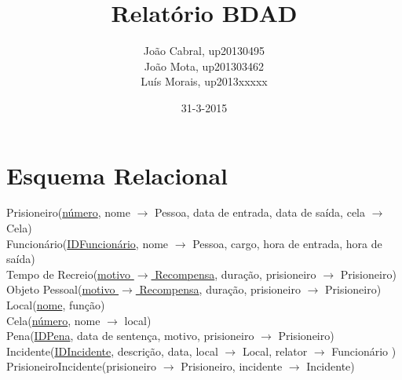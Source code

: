 \documentclass{article}
\title{Relatório BDAD}
\date{31-3-2015}
\author{João Cabral, up20130495\\
	   João Mota, up201303462\\
	   Luís Morais, up2013xxxxx}
\begin{document}
\maketitle
{}
\newpage
{}

\section{Esquema Relacional}

Prisioneiro(\underline{número}, nome $\rightarrow$ Pessoa, data de entrada, data de saída, cela $\rightarrow$ Cela)\\
Funcionário(\underline{IDFuncionário}, nome $\rightarrow$ Pessoa, cargo, hora de entrada, hora de saída)\\
Tempo de Recreio(\underline{motivo $\rightarrow$ Recompensa}, duração, prisioneiro $\rightarrow$ Prisioneiro)\\
Objeto Pessoal(\underline{motivo $\rightarrow$ Recompensa}, duração, prisioneiro $\rightarrow$ Prisioneiro)\\
Local(\underline{nome}, função)\\
Cela(\underline{número}, nome $\rightarrow$ local)\\
Pena(\underline{IDPena}, data de sentença, motivo, prisioneiro $\rightarrow$ Prisioneiro)\\
Incidente(\underline{IDIncidente}, descrição, data, local $\rightarrow$ Local, relator $\rightarrow$ Funcionário )\\
PrisioneiroIncidente(prisioneiro $\rightarrow$ Prisioneiro, incidente $\rightarrow$ Incidente)\\


\end{document}
